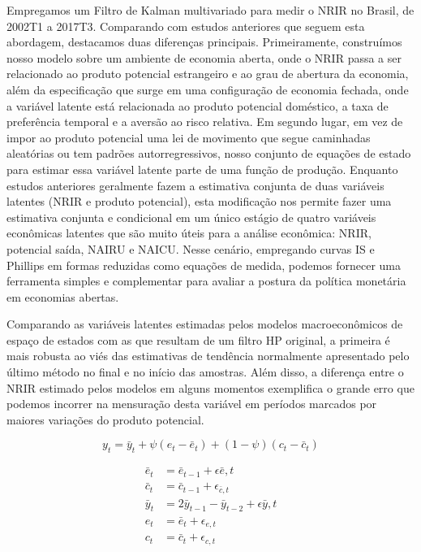 Empregamos um Filtro de Kalman multivariado para medir o NRIR no Brasil, de 2002T1 a 2017T3. Comparando com estudos anteriores que seguem esta abordagem, destacamos duas diferenças principais. Primeiramente, construímos nosso modelo sobre um ambiente de economia aberta, onde o NRIR passa a ser relacionado ao produto potencial estrangeiro e ao grau de abertura da economia, além da especificação que surge em uma configuração de economia fechada, onde a variável latente está relacionada ao produto potencial doméstico, a taxa de preferência temporal e a aversão ao risco relativa. Em segundo lugar, em vez de impor ao produto potencial uma lei de movimento que segue caminhadas aleatórias ou tem padrões autorregressivos, nosso conjunto de equações de estado para estimar essa variável latente parte de uma função de produção. Enquanto estudos anteriores geralmente fazem a estimativa conjunta de duas variáveis latentes (NRIR e produto potencial), esta modificação nos permite fazer uma estimativa conjunta e condicional em um único estágio de quatro variáveis econômicas latentes que são muito úteis para a análise econômica: NRIR, potencial saída, NAIRU e NAICU. Nesse cenário, empregando curvas IS e Phillips em formas reduzidas como equações de medida, podemos fornecer uma ferramenta simples e complementar para avaliar a postura da política monetária em economias abertas.

Comparando as variáveis latentes estimadas pelos modelos macroeconômicos de espaço de estados com as que resultam de um filtro HP original, a primeira é mais robusta ao viés das estimativas de tendência normalmente apresentado pelo último método no final e no início das amostras. Além disso, a diferença entre o NRIR estimado pelos modelos em alguns momentos exemplifica o grande erro que podemos incorrer na mensuração desta variável em períodos marcados por maiores variações do produto potencial.


$$
y_{t}=\bar{y}_{t}+\psi\left(e_{t}-\bar{e}_{t}\right)+(1-\psi)\left(c_{t}-\bar{c}_{t}\right)
$$

$$
\begin{aligned}
\bar{e}_{t} &=\bar{e}_{t-1}+\epsilon \bar{e}, t \\
\bar{c}_{t} &=\bar{c}_{t-1}+\epsilon_{\bar{c}, t} \\
\bar{y}_{t} &=2 \bar{y}_{t-1}-\bar{y}_{t-2}+\epsilon \bar{y}, t \\
e_{t} &=\bar{e}_{t}+\epsilon_{e, t} \\
c_{t} &=\bar{c}_{t}+\epsilon_{c, t}
\end{aligned}
$$

